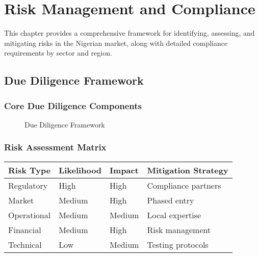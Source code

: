
\chapter{Risk Management and Compliance}

\begin{importantbox}
This chapter provides a comprehensive framework for identifying, assessing, and mitigating risks in the Nigerian market, along with detailed compliance requirements by sector and region.
\end{importantbox}

\section{Due Diligence Framework}

\subsection{Core Due Diligence Components}

\begin{figure}[htbp]
    \centering
    \caption{Due Diligence Framework}
    \label{fig:due-diligence}
\end{figure}

\subsection{Risk Assessment Matrix}
\begin{center}
\begin{tabularx}{\textwidth}{>{\raggedright\arraybackslash}X >{\centering\arraybackslash}X >{\centering\arraybackslash}X >{\raggedright\arraybackslash}X}
    \toprule
    \textbf{Risk Type} & \textbf{Likelihood} & \textbf{Impact} & \textbf{Mitigation Strategy} \\
    \midrule
    Regulatory & High & High & Compliance partners \\
    Market & Medium & High & Phased entry \\
    Operational & Medium & Medium & Local expertise \\
    Financial & Medium & High & Risk management \\
    Technical & Low & Medium & Testing protocols \\
    \bottomrule
\end{tabularx}
\end{center}

